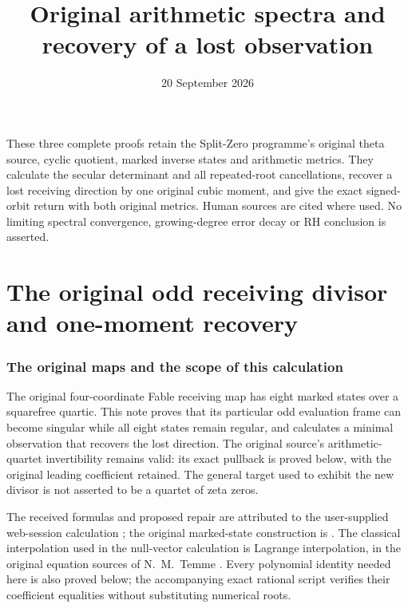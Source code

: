 \documentclass[11pt]{article}
\title{Original arithmetic spectra and recovery of a lost observation}
\author{}\date{20 September 2026}
\begin{document}
\maketitle
These three complete proofs retain the Split-Zero programme's original
theta source, cyclic quotient, marked inverse states and arithmetic metrics.
They calculate the secular determinant and all repeated-root cancellations,
recover a lost receiving direction by one original cubic moment, and
give the exact signed-orbit return with both original metrics.
Human sources are cited where used. No limiting spectral convergence,
growing-degree error decay or RH conclusion is asserted.


\clearpage\begingroup
\part*{The original odd receiving divisor and one-moment recovery}
\newtheorem{sfrepairtheorem}{Theorem}
\newtheorem{sfrepairproposition}[sfrepairtheorem]{Proposition}
\newcommand{\sfrepairC}{\mathbb C}
\newcommand{\sfrepairdd}{\mathfrak D_{\rm odd}}
\newcommand{\sfrepairrem}{\operatorname{rem}}
\newcommand{\sfrepairdiag}{\operatorname{diag}}


\section{The original maps and the scope of this calculation}
The original four-coordinate Fable receiving map has eight marked states
over a squarefree quartic. This note proves that its particular odd
evaluation frame can become singular while all eight states remain
regular, and calculates a minimal observation that recovers the lost
direction. The original source's arithmetic-quartet invertibility
remains valid: its exact pullback is proved below, with the original
leading coefficient retained. The general target used to exhibit the
new divisor is not asserted to be a quartet of zeta zeros.

The received formulas and proposed repair are attributed to the
user-supplied web-session calculation \cite{sfrepair:Incoming}; the original
marked-state construction is \cite[SE1--14, GF20--21]{sfrepair:Fable}.
The classical interpolation used in the null-vector calculation is
Lagrange interpolation, in the original equation sources of
N.~M.~Temme \cite{sfrepair:Temme}. Every polynomial identity needed here is
also proved below; the accompanying exact rational script verifies
their coefficient equalities without substituting numerical roots.
\end{document}
